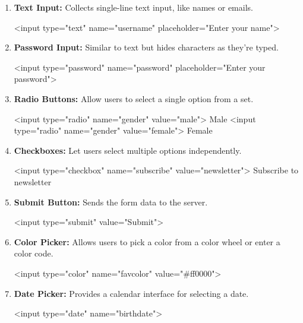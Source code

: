 \documentclass{report}
\begin{document}
\begin{itemize}
\begin{enumerate}
            \item \textbf{Text Input:} Collects single-line text input, like names or emails.
                \bigbreak \noindent 
                \begin{htmlcode}
                    <input type="text" name="username" placeholder="Enter your name">
                \end{htmlcode}
            \item \textbf{Password Input:} Similar to text but hides characters as they’re typed.
                \bigbreak \noindent 
                \begin{htmlcode}
                 <input type="password" name="password" placeholder="Enter your password">
                \end{htmlcode}
            \item \textbf{Radio Buttons:} Allow users to select a single option from a set.
                \bigbreak \noindent 
                \begin{htmlcode}
                    <input type="radio" name="gender" value="male"> Male
                    <input type="radio" name="gender" value="female"> Female
                \end{htmlcode}
            \item \textbf{Checkboxes:} Let users select multiple options independently.
                \bigbreak \noindent 
                \begin{htmlcode}
                 <input type="checkbox" name="subscribe" value="newsletter"> Subscribe to newsletter
                \end{htmlcode}
            \item \textbf{Submit Button:} Sends the form data to the server.
                \bigbreak \noindent 
                \begin{htmlcode}
                    <input type="submit" value="Submit">
                \end{htmlcode}
            \item \textbf{Color Picker:} Allows users to pick a color from a color wheel or enter a color code.
                \bigbreak \noindent 
                \begin{htmlcode}
                    <input type="color" name="favcolor" value="#ff0000">
                \end{htmlcode}
                
            \item \textbf{Date Picker:} Provides a calendar interface for selecting a date.
                \bigbreak \noindent 
                \begin{htmlcode}
                    <input type="date" name="birthdate">
                \end{htmlcode}


\end{enumerate}
\end{itemize}
\end{document}
